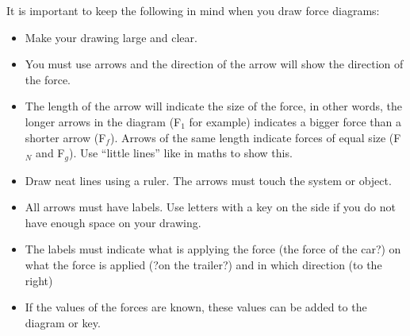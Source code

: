 It is important to keep the following in mind when you draw force diagrams:
\begin{itemize}
\item Make your drawing large and clear.
\item You must use arrows and the direction of the arrow will show the direction of the force.
\item The length of the arrow will indicate the size of the force, in other words, the longer arrows in the diagram (F$_1$ for example) indicates a bigger force than a shorter arrow (F$_f$). Arrows of the same length indicate forces of equal size (F$_N$ and F$_g$). Use ``little lines'' like in maths to show this.
\item Draw neat lines using a ruler. The arrows must touch the system or object.
\item All arrows must have labels. Use letters with a key on the side if you do not have enough space on your drawing.
\item The labels must indicate what is applying the force (the force of the car?) on what the force is applied (?on the trailer?) and in which direction (to the right)
\item If the values of the forces are known, these values can be added to the diagram or key.
\end{itemize}

